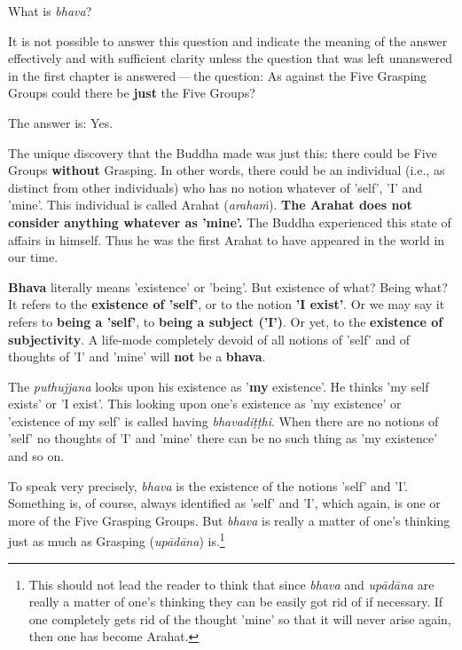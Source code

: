 What is \emph{bhava}?


It is not possible to answer this question and indicate the meaning of
the answer effectively and with sufficient clarity unless the question
that was left unanswered in the first chapter is answered — the
question: As against the Five Grasping Groups could there be \textbf{just} the
Five Groups?


The answer is: Yes.


The unique discovery that the Buddha made was just this: there could be
Five Groups \textbf{without} Grasping. In other words, there could be an
individual (i.e., as distinct from other individuals) who has no notion
whatever of 'self', 'I' and 'mine'. This individual is called Arahat
(\emph{arahaṁ}). \textbf{The Arahat does not consider anything whatever as
'mine'.} The Buddha experienced this state of affairs in himself. Thus
he was the first Arahat to have appeared in the world in our time.


\textbf{Bhava} literally means 'existence' or 'being'. But existence of what?
Being what? It refers to the \textbf{existence of 'self'}, or to the notion
\textbf{'I exist'}. Or we may say it refers to \textbf{being a 'self'}, to \textbf{being
a subject ('I')}. Or yet, to the \textbf{existence of subjectivity}. A
life-mode completely devoid of all notions of 'self' and of thoughts of
'I' and 'mine' will \textbf{not} be a \textbf{bhava}.


The \emph{puthujjana} looks upon his existence as '\textbf{my} existence'. He
thinks 'my self exists' or 'I exist'. This looking upon one’s existence
as 'my existence' or 'existence of my self' is called having
\emph{bhavadiṭṭhi}. When there are no notions of 'self' no thoughts of 'I'
and 'mine' there can be no such thing as 'my existence' and so on.


To speak very precisely, \emph{bhava} is the existence of the notions 'self'
and 'I'. Something is, of course, always identified as 'self' and 'I',
which again, is one or more of the Five Grasping Groups. But \emph{bhava} is
really a matter of one’s thinking just as much as Grasping (\emph{upādāna})
is.\footnote{This should not lead the reader to think that since \emph{bhava} and \emph{upādāna} are really a matter of one’s thinking they can be easily got rid of if necessary. If one completely gets rid of the thought 'mine' so that it will never arise again, then one has become Arahat.}


